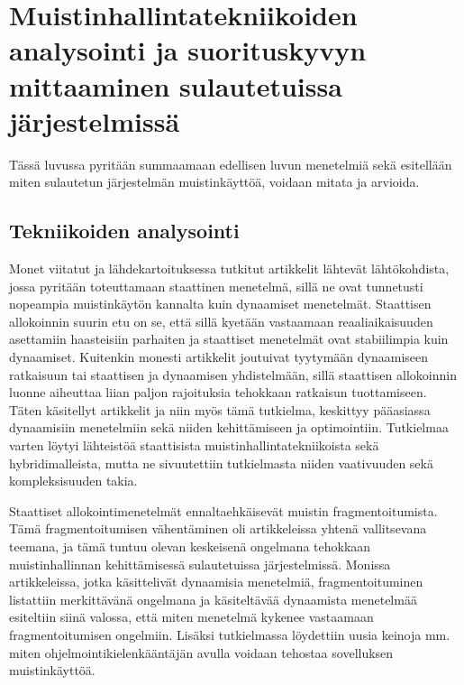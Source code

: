 \chapter{Muistinhallintatekniikoiden analysointi ja suorituskyvyn mittaaminen sulautetuissa järjestelmissä} \label{Kuudes luku}

Tässä luvussa pyritään summaamaan edellisen luvun menetelmiä sekä esitellään miten sulautetun järjestelmän muistinkäyttöä, voidaan mitata ja arvioida.

\section{Tekniikoiden analysointi}

Monet viitatut ja lähdekartoituksessa tutkitut artikkelit lähtevät lähtökohdista, jossa pyritään toteuttamaan staattinen menetelmä, sillä ne ovat tunnetusti nopeampia muistinkäytön kannalta kuin dynaamiset menetelmät\cite{daroemmfera@2006}\cite{soeosmm@2009}. Staattisen allokoinnin suurin etu on se, että sillä kyetään vastaamaan reaaliaikaisuuden asettamiin haasteisiin parhaiten ja staattiset menetelmät ovat stabiilimpia kuin dynaamiset\cite{daroemmfera@2006}. Kuitenkin monesti artikkelit joutuivat tyytymään dynaamiseen ratkaisuun tai staattisen ja dynaamisen yhdistelmään, sillä staattisen allokoinnin luonne aiheuttaa liian paljon rajoituksia tehokkaan ratkaisun tuottamiseen\cite{daroemmfera@2006}\cite{soeosmm@2009}. Täten käsitellyt artikkelit ja niin myös tämä tutkielma, keskittyy pääasiassa dynaamisiin menetelmiin sekä niiden kehittämiseen ja optimointiin. Tutkielmaa varten löytyi lähteistöä staattisista muistinhallintatekniikoista sekä hybridimalleista, mutta ne sivuutettiin tutkielmasta niiden vaativuuden sekä kompleksisuuden takia.

Staattiset allokointimenetelmät ennaltaehkäisevät muistin fragmentoitumista\cite{daroemmfera@2006}. Tämä fragmentoitumisen vähentäminen oli artikkeleissa yhtenä vallitsevana teemana, ja tämä tuntuu olevan keskeisenä ongelmana tehokkaan muistinhallinnan kehittämisessä sulautetuissa järjestelmissä. Monissa artikkeleissa, jotka käsittelivät dynaamisia menetelmiä, fragmentoituminen listattiin merkittävänä ongelmana ja käsiteltävää dynaamista menetelmää esiteltiin siinä valossa, että miten menetelmä kykenee vastaamaan fragmentoitumisen ongelmiin.\cite{daroemmfera@2006}\cite{ammsfmes@2016}\cite{b@2020} Lisäksi tutkielmassa löydettiin uusia keinoja mm. miten ohjelmointikielenkääntäjän avulla voidaan tehostaa sovelluksen muistinkäyttöä.

